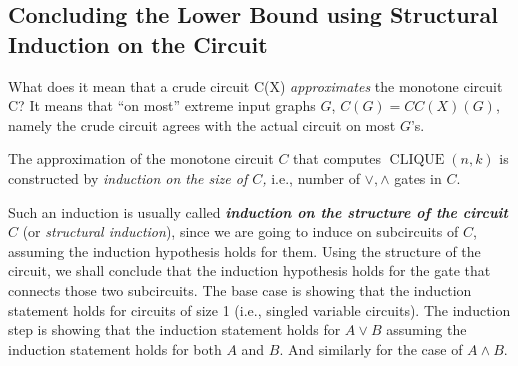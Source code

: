 %


\subsection{Concluding the Lower Bound using Structural Induction on the Circuit   }



% 



What does it mean that a crude circuit C(X) \emph{approximates} the monotone circuit C? It means that ``on most'' extreme input graphs $G$, $C(G) = CC(X)(G)$, namely the crude circuit agrees with the actual circuit on most $G$'s. 

The approximation of the  monotone circuit $C$ that computes $\operatorname{CLIQUE}(n, k)$ is constructed  by\emph{ induction on the size of $C$,} i.e., number of $\lor, \wedge$ gates in $C$.


\begin{tcolorbox}[colframe=white, colback=blue!11, boxrule=0mm, sharp corners]
\begin{note} Such an induction is usually called \emph{\textbf{induction on the structure of the circuit} $C$} (or \emph{structural induction}), since we are going to induce on subcircuits of $C$, assuming the induction hypothesis holds for them. Using the structure of the circuit, we shall conclude that the induction hypothesis  holds for the gate that connects those two subcircuits. The base case is showing that the induction statement holds for circuits of size 1 (i.e., singled variable circuits). The induction step is showing that the induction statement holds for $A\lor B$ assuming the induction statement holds for both $A$ and $B$. And similarly for the case of $A\land B$.     
\end{note}
\end{tcolorbox}


